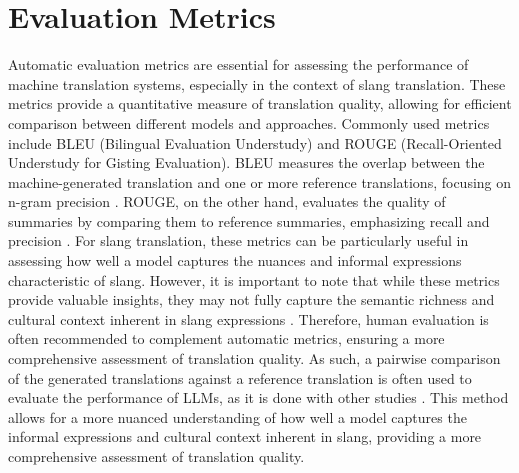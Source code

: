 \section{Evaluation Metrics}
Automatic evaluation metrics are essential for assessing the performance of machine translation systems, especially in the context of slang translation. These metrics provide a quantitative measure of translation quality, allowing for efficient comparison between different models and approaches. Commonly used metrics include BLEU (Bilingual Evaluation Understudy) and ROUGE (Recall-Oriented Understudy for Gisting Evaluation). BLEU measures the overlap between the machine-generated translation and one or more reference translations, focusing on n-gram precision \cite{papineni_roukos_ward_zhu_2001}. ROUGE, on the other hand, evaluates the quality of summaries by comparing them to reference summaries, emphasizing recall and precision \cite{lin_2004}. For slang translation, these metrics can be particularly useful in assessing how well a model captures the nuances and informal expressions characteristic of slang. However, it is important to note that while these metrics provide valuable insights, they may not fully capture the semantic richness and cultural context inherent in slang expressions \cite{liang2025slangditbenchmarkingllmsinterpretative}. Therefore, human evaluation is often recommended to complement automatic metrics, ensuring a more comprehensive assessment of translation quality. As such, a pairwise comparison of the generated translations against a reference translation is often used to evaluate the performance of LLMs, as it is done with other studies \cite{zhao2024loraland310finetuned}\cite{tunstall2023zephyr}\cite{chiang2024chatbot}. This method allows for a more nuanced understanding of how well a model captures the informal expressions and cultural context inherent in slang, providing a more comprehensive assessment of translation quality.

